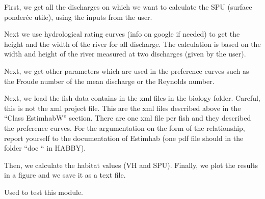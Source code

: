 \documentclass[letterpaper,10pt,english]{sphinxmanual}
\begin{document}
\begin{fulllineitems}
\begin{quote}
\begin{description}
\end{description}\end{quote}


First, we get all the discharges on which we want to calculate the SPU (surface ponderée utile),
using the inputs from the user.

Next we use hydrological rating curves (info on google if needed) to get the height and the width of the river for
all discharge. The calculation is based on the width and height of the river measured at two discharges (given by the
user).

Next, we get other parameters which are used in the preference curves such as the Froude number of
the mean discharge or the Reynolds number.

Next, we load the fish data contains in the xml files in the biology folder. Careful, this is not the xml project
file. This are the xml files described above in the “Class EstimhabW” section. There are one xml file per fish and
they described the preference curves. For the argumentation on the form of the relationship, report yourself to the
documentation of Estimhab (one pdf file should in the folder “doc “ in HABBY).

Then, we calculate the habitat values (VH and SPU). Finally, we plot the results in a figure and we save it as
a text file.

\end{fulllineitems}


\begin{fulllineitems}
\label{\detokenize{index:src.estimhab.main}}
Used to test this module.

\end{fulllineitems}

\end{document}
